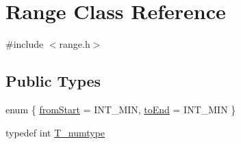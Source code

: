 \hypertarget{classRange}{}\section{Range Class Reference}
\label{classRange}


{\ttfamily \#include $<$range.\+h$>$}

\subsection*{Public Types}
\begin{DoxyCompactItemize}
\item 
enum \{ \hyperlink{classRange_a2b1b2460ff7aab2f436e5fea6ca23391a3311c8d65af747a2557d7bcc08ab3f0c}{from\+Start} = I\+N\+T\+\_\+\+M\+I\+N, 
\hyperlink{classRange_a2b1b2460ff7aab2f436e5fea6ca23391a552a0421135e863c3d93e9896c777f34}{to\+End} = I\+N\+T\+\_\+\+M\+I\+N
 \}
\item 
typedef int \hyperlink{classRange_a7a87483a88a6bc1ae142f15459a6b630}{T\+\_\+numtype}
\end{DoxyCompactItemize}
